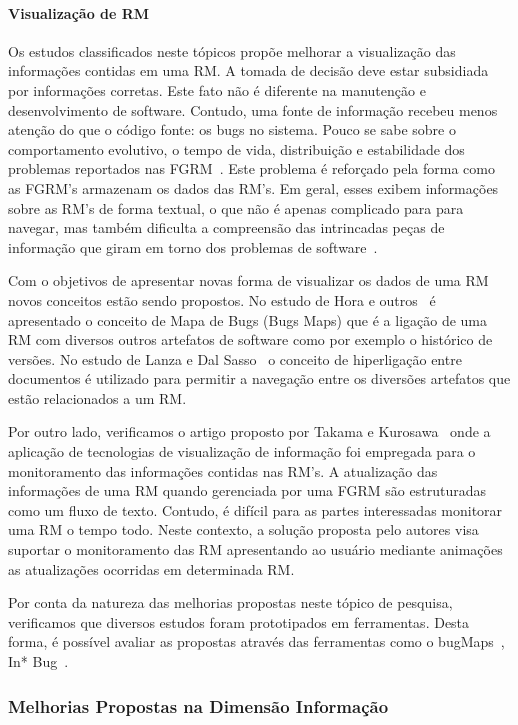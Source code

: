 \paragraph{Visualização de RM}
Os estudos classificados neste tópicos propõe melhorar a visualização das
informações contidas em uma RM\@. A tomada de decisão deve estar subsidiada por
informações corretas. Este fato não é diferente na manutenção e desenvolvimento
de software. Contudo, uma fonte de informação recebeu menos atenção do que o
código fonte: os bugs no sistema. Pouco se sabe sobre o comportamento evolutivo,
o tempo de vida, distribuição e estabilidade dos problemas reportados nas
FGRM~\cite{hora2012bug}. Este problema é reforçado pela forma como as FGRM's
armazenam os dados das RM's. Em geral, esses exibem informações sobre as RM's de
forma textual, o que não é apenas complicado para para navegar, mas também
dificulta a compreensão das intrincadas peças de informação que giram em torno
dos problemas de software~\cite{dal2014bug}.

Com o objetivos de apresentar novas forma de visualizar os dados de uma RM novos
conceitos estão sendo propostos. No estudo de Hora e outros~\cite{hora2012bug} é
apresentado o conceito de Mapa de Bugs (Bugs Maps) que é a ligação de uma RM com
diversos outros artefatos de software como por exemplo o histórico de versões.
No estudo de Lanza e  Dal Sasso~\cite{dal2014bug} o conceito de hiperligação
entre documentos é utilizado para permitir a navegação entre os diversões
artefatos que estão relacionados a um RM\@.

Por outro lado, verificamos o artigo proposto por Takama e
Kurosawa~\cite{takama2013application} onde a aplicação de tecnologias de
visualização de informação foi empregada para o monitoramento das informações
contidas nas RM's. A atualização das informações de uma RM quando gerenciada por
uma FGRM são estruturadas como um fluxo de texto. Contudo, é difícil para as
partes interessadas monitorar uma RM o tempo todo. Neste contexto, a solução
proposta pelo autores visa suportar o monitoramento das RM apresentando ao
usuário mediante animações as atualizações ocorridas em determinada RM\@.

Por conta da natureza das melhorias propostas neste tópico de pesquisa,
verificamos que diversos estudos foram prototipados em ferramentas. Desta forma,
é possível avaliar as propostas através das ferramentas como o
bugMaps~\cite{hora2012bug}, In* Bug~\cite{dal2014bug}.

\subsubsection{Melhorias Propostas na Dimensão Informação}
\label{ssub:melhorias_dim_informacao}

